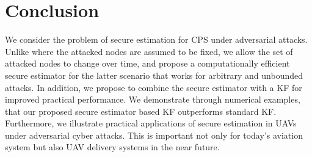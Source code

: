 \documentclass[../../thesis.tex]{subfiles}
\begin{document}
\section{Conclusion}
We consider the problem of secure estimation for CPS under adversarial attacks. Unlike \cite{Fawzi:2014} where the attacked nodes are assumed to be fixed, we allow the set of attacked nodes to change over time, and propose a computationally efficient secure estimator for the latter scenario that works for arbitrary and unbounded attacks. In addition, we propose to combine the secure estimator with a KF for improved practical performance. We demonstrate through numerical examples, that our proposed secure estimator based KF outperforms standard KF. Furthermore, we illustrate practical applications of secure estimation in UAVs under adversarial cyber attacks. This is important not only for today's aviation system but also UAV delivery systems in the near future. 
                                 
\end{document}
